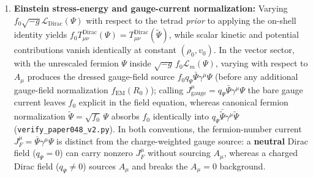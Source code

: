 \documentclass[
  american,
  11pt,
  letterpaper,
]{article}
\begin{document}
\begin{enumerate}
\begin{equation}
\begin{aligned}
& \mathcal{L}_m\big|_{\mathrm{on\text{-}shell}} = (1 - n)\mathcal{L}_{\mathrm{int}}, \\
& \left.\frac{\delta S}{\delta |\psi|}\right|_{(\rho_0, v_0),\,\mathrm{on\text{-}shell}} = (1 - n)\,f'_{\mathrm{SM}}(v_0)\,\mathcal{L}_{\mathrm{int}}.
\end{aligned}
\end{equation} Two sharp consequences follow immediately: (a) a bilinear interaction (\(n = 1\), i.e.~a mass shift \(g\bar{\Psi}\Psi\)) gives \(\mathcal{L}_{\mathrm{Dirac}} = -\mathcal{L}_{\mathrm{int}}\) and total \(\mathcal{L}_m = (1 - 1)\mathcal{L}_{\mathrm{int}} = 0\), so the constant-background truncation \textbf{still holds} (refuting any overbroad statement that every nonzero interaction breaks it); and (b) for a four-fermion interaction (\(n = 2\), \(\mathcal{L}_{\mathrm{int}} = \lambda B^2\)), \(\mathcal{L}_{\mathrm{Dirac}} = -2\lambda B^2\), \(\mathcal{L}_m = -\lambda B^2\), and the scalar source is \textbf{\(-f'_{\mathrm{SM}}(v_0)\,\mathcal{L}_{\mathrm{int}} = -\frac{v_0}{\psi_0^2 M_{\mathrm{sym}}^2}\lambda B^2\)} (opposite in sign to the naive \(+f'_0\mathcal{L}_{\mathrm{int}}\) obtained by erroneously keeping \(\mathcal{L}_{\mathrm{Dirac}} = 0\)).
\item
  \textbf{Einstein stress-energy and gauge-current normalization:} Varying \(f_0\sqrt{-g}\mathcal{L}_{\mathrm{Dirac}}(\Psi)\) with respect to the tetrad \emph{prior} to applying the on-shell identity yields \(f_0 T^{\mathrm{Dirac}}_{\mu\nu}(\Psi) = T^{\mathrm{Dirac}}_{\mu\nu}(\tilde{\Psi})\), while scalar kinetic and potential contributions vanish identically at constant \((\rho_0, v_0)\). In the vector sector, with the unrescaled fermion \(\Psi\) inside \(\sqrt{-g}\,f_0\mathcal{L}_m(\Psi)\), varying with respect to \(A_\mu\) produces the dressed gauge-field source \(f_0 q_\Psi \bar{\Psi}\gamma^\mu\Psi\) (before any additional gauge-field normalization \(f_{\mathrm{EM}}(R_0)\)); calling \(J_{\mathrm{gauge}}^\mu = q_\Psi \bar{\Psi}\gamma^\mu\Psi\) the bare gauge current leaves \(f_0\) explicit in the field equation, whereas canonical fermion normalization \(\tilde{\Psi} = \sqrt{f_0}\,\Psi\) absorbs \(f_0\) identically into \(q_\Psi\bar{\tilde{\Psi}}\gamma^\mu\tilde{\Psi}\) (\nolinkurl{verify_paper048_v2.py}). In both conventions, the fermion-number current \(J_F^\mu = \bar{\Psi}\gamma^\mu\Psi\) is distinct from the charge-weighted gauge source: a \textbf{neutral} Dirac field (\(q_\Psi = 0\)) can carry nonzero \(J_F^\mu\) without sourcing \(A_\mu\), whereas a charged Dirac field (\(q_\Psi \neq 0\)) sources \(A_\mu\) and breaks the \(A_\mu = 0\) background.
\end{enumerate}
\end{document}
